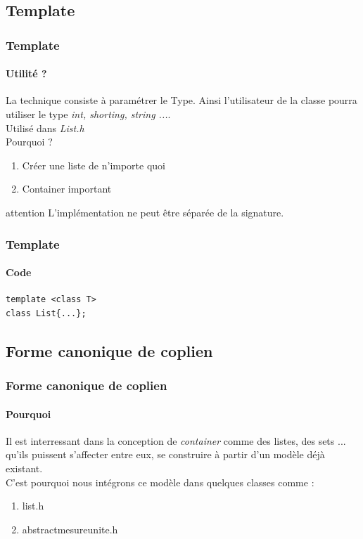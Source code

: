 \documentclass[10pt]{beamer}
\begin{document}
\subsection{Template}

\begin{frame}
  \frametitle{Template}
  \framesubtitle{Utilité ?}
  La technique consiste à paramétrer le Type. Ainsi l'utilisateur de la classe pourra utiliser le type \emph{int, shorting, string ...}.\\

  Utilisé dans \emph{List.h}\\

  Pourquoi ?
  \begin{enumerate}
    \item Créer une liste de n'importe quoi
    \item Container important
  \end{enumerate}

  \begin{alertblock}{attention}
    L'implémentation ne peut être séparée de la signature.
  \end{alertblock}
\end{frame}

\begin{frame}[fragile]
  \frametitle{Template}
  \framesubtitle{Code}
  \begin{verbatim}
template <class T>
class List{...};
  \end{verbatim}
\end{frame}

  \subsection{Forme canonique de coplien}
\begin{frame}[fragile]
  \frametitle{Forme canonique de coplien}
  \framesubtitle{Pourquoi}

  Il est interressant dans la conception de \emph{container} comme des listes, des sets ... qu'ils puissent s'affecter entre eux, se construire à partir d'un modèle déjà existant.\\

  C'est pourquoi nous intégrons ce modèle dans quelques classes comme :
  \begin{enumerate}
    \item list.h
    \item abstractmesureunite.h
  \end{enumerate}
\end{frame}
\end{document}
